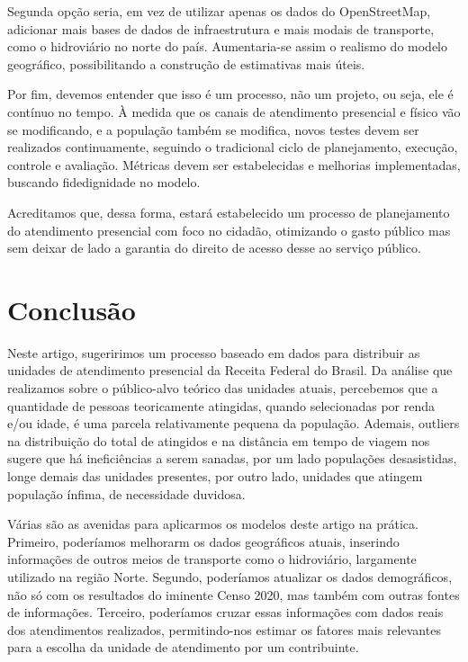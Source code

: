 \documentclass[]{article}
\begin{document}
Segunda opção seria, em vez de utilizar apenas os dados do
OpenStreetMap, adicionar mais bases de dados de infraestrutura e mais
modais de transporte, como o hidroviário no norte do país. Aumentaria-se
assim o realismo do modelo geográfico, possibilitando a construção de
estimativas mais úteis.

Por fim, devemos entender que isso é um processo, não um projeto, ou
seja, ele é contínuo no tempo. À medida que os canais de atendimento
presencial e físico vão se modificando, e a população também se
modifica, novos testes devem ser realizados continuamente, seguindo o
tradicional ciclo de planejamento, execução, controle e avaliação.
Métricas devem ser estabelecidas e melhorias implementadas, buscando
fidedignidade no modelo.

Acreditamos que, dessa forma, estará estabelecido um processo de
planejamento do atendimento presencial com foco no cidadão, otimizando o
gasto público mas sem deixar de lado a garantia do direito de acesso
desse ao serviço público.

\hypertarget{conclusao}{%
\section{Conclusão}\label{conclusao}}

Neste artigo, sugeririmos um processo baseado em dados para distribuir
as unidades de atendimento presencial da Receita Federal do Brasil. Da
análise que realizamos sobre o público-alvo teórico das unidades atuais,
percebemos que a quantidade de pessoas teoricamente atingidas, quando
selecionadas por renda e/ou idade, é uma parcela relativamente pequena
da população. Ademais, outliers na distribuição do total de atingidos e
na distância em tempo de viagem nos sugere que há ineficiências a serem
sanadas, por um lado populações desasistidas, longe demais das unidades
presentes, por outro lado, unidades que atingem população ínfima, de
necessidade duvidosa.

Várias são as avenidas para aplicarmos os modelos deste artigo na
prática. Primeiro, poderíamos melhorarm os dados geográficos atuais,
inserindo informações de outros meios de transporte como o hidroviário,
largamente utilizado na região Norte. Segundo, poderíamos atualizar os
dados demográficos, não só com os resultados do iminente Censo 2020, mas
também com outras fontes de informações. Terceiro, poderíamos cruzar
essas informações com dados reais dos atendimentos realizados,
permitindo-nos estimar os fatores mais relevantes para a escolha da
unidade de atendimento por um contribuinte.
\end{document}
